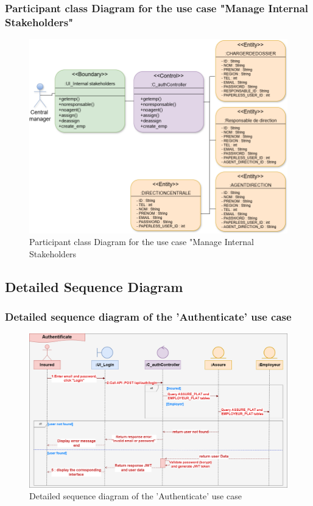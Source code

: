\subsubsection{Participant class Diagram for the use case "Manage Internal Stakeholders"}
 \begin{figure}[h!]
    \centering
    \includegraphics[width=1\textwidth]{figures/dc Manages Internal Stakeholders.png}
    \caption{Participant class Diagram for the use case "Manage Internal Stakeholders}
\end{figure}

\subsection{Detailed Sequence Diagram}
\subsubsection{Detailed sequence diagram of the 'Authenticate' use case}
\clearpage
\begin{figure}[h!]
    \centering
    \includegraphics[width=1\textwidth]{figures/det authentificate.png}
    \caption{Detailed sequence diagram of the 'Authenticate' use case}
\end{figure}

